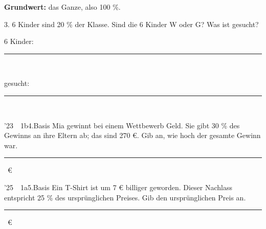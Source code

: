 \documentclass[11pt]{article}
\newcommand{\gbegriff}[1]{\par\nobreak\noindent\hspace*{\mbpfnr}\parbox[t]{\dimexpr\linewidth-\mbpfnr\relax}{\raggedright\small\color{mbgrau}#1}\par\nobreak\addvspace{3pt}}
\newcommand{\linie}[1]{\,{\color{black!45}\rule[-1pt]{#1}{0.4pt}}\,}
\newcommand{\pkt}{\textperiodcentered{}}
\begin{document}
\Needspace*{0.16\textheight}\gbegriff{\textbf{Grundwert:} das Ganze, also 100 \%.}
\begin{pfaufg}{}{3.}{}
6 Kinder sind 20 \% der Klasse. Sind die 6 Kinder W oder G? Was ist gesucht?
\par\smallskip
\par\noindent \hfill\hfill 6 Kinder: \linie{30mm}\par\noindent\hfill gesucht: \linie{30mm}
\par{}
\end{pfaufg}
\begin{pfaufg}{’23~\pkt{}~1b}{4.}{Basis}
Mia gewinnt bei einem Wettbewerb Geld. Sie gibt 30 \% des Gewinns an ihre Eltern ab; das sind 270 €. Gib an, wie hoch der gesamte Gewinn war.
\hfill\linie{30mm} €
\end{pfaufg}
\begin{pfaufg}{’25~\pkt{}~1a}{5.}{Basis}
Ein T-Shirt ist um 7 € billiger geworden. Dieser Nachlass entspricht 25 \% des ursprünglichen Preises. Gib den ursprünglichen Preis an.
\hfill\linie{30mm} €
\end{pfaufg}
\end{document}
